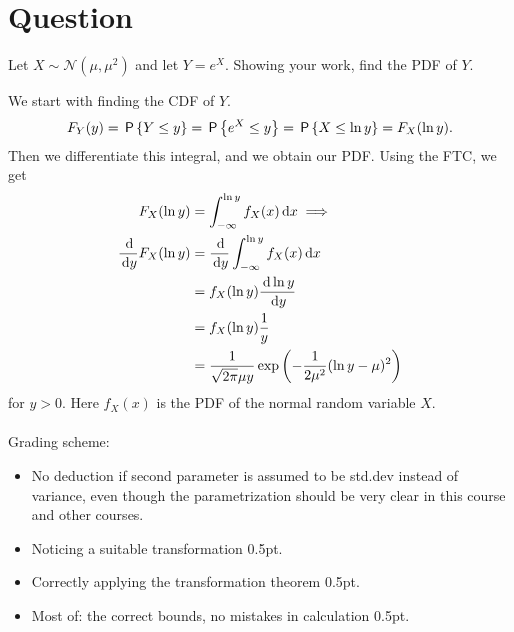 \section*{Question}

\begin{exercise}[1.5]
Let $X\sim\mathcal{N}(\mu,\mu^2)$ and let $Y = e^X$. Showing your work, find the PDF of $Y$.
\begin{solution}
We start with finding the CDF of $Y$.
\begin{align*}
    F_Y(y) = \P{Y\leq y} = \P{e^X\leq y} = \P{X\leq \ln{y}} = F_X(\ln{y}).
\end{align*}
Then we differentiate this integral, and we obtain our PDF. Using the FTC, we get
\begin{align*}
    F_X(\ln{y}) &= \int_{-\infty}^{\ln{y}}{f_X(x)\d x}\implies\\
    \frac{\d }{\d y}F_X(\ln{y}) &= \frac{\d }{\d y}\int_{-\infty}^{\ln{y}}{f_X(x)\d x}\\
    &= f_X(\ln{y})\frac{\d \ln{y}}{\d y}\\
    &= f_X(\ln{y})\frac1 y\\
    &= \frac{1}{\sqrt{2\pi}\mu y}\exp{\left(-\frac{1}{2\mu^2}(\ln{y}-\mu)^2\right)}
\end{align*}
for $y>0$. Here $f_X(x)$ is the PDF of the normal random variable $X$.
\\\\
Grading scheme:
\begin{itemize}
    \item No deduction if second parameter is assumed to be std.dev instead of variance, even though the parametrization should be very clear in this course and other courses.
    \item Noticing a suitable transformation 0.5pt.
    \item Correctly applying the transformation theorem 0.5pt.
    \item Most of: the correct bounds, no mistakes in calculation 0.5pt.
\end{itemize}
\end{solution}
\end{exercise}

